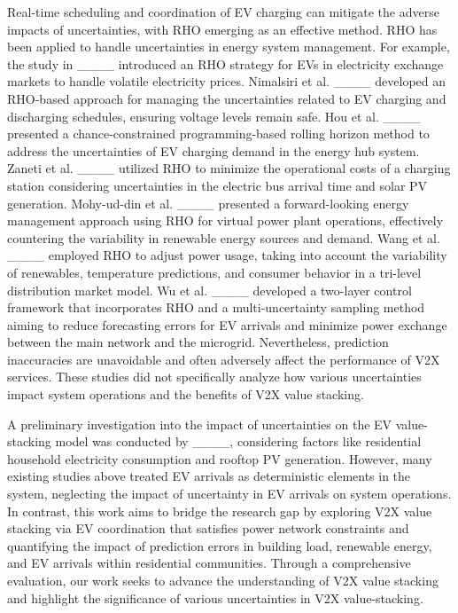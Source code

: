 Real-time scheduling and coordination of EV charging can mitigate the adverse impacts of uncertainties, with RHO emerging as an effective method. RHO has been applied to handle uncertainties in energy system management. For example, the study in ____ introduced an RHO strategy for EVs in electricity exchange markets to handle volatile electricity prices. Nimalsiri et al. ____ developed an RHO-based approach for managing the uncertainties related to EV charging and discharging schedules, ensuring voltage levels remain safe. Hou et al. ____ presented a chance-constrained programming-based rolling horizon method to address the uncertainties of EV charging demand in the energy hub system. Zaneti et al. ____ utilized RHO to minimize the operational costs of a charging station considering uncertainties in the electric bus arrival time and solar PV generation. Mohy-ud-din et al. ____ presented a forward-looking energy management approach using RHO for virtual power plant operations, effectively countering the variability in renewable energy sources and demand. Wang et al. ____ employed RHO to adjust power usage, taking into account the variability of renewables, temperature predictions, and consumer behavior in a tri-level distribution market model. Wu et al. ____ developed a two-layer control framework that incorporates RHO and a multi-uncertainty sampling method aiming to reduce forecasting errors for EV arrivals and minimize power exchange between the main network and the microgrid. Nevertheless, prediction inaccuracies are unavoidable and often adversely affect the performance of V2X services. These studies did not specifically analyze how various uncertainties impact system operations and the benefits of V2X value stacking. 

A preliminary investigation into the impact of uncertainties on the EV value-stacking model was conducted by ____, considering factors like residential household electricity consumption and rooftop PV generation. However, many existing studies above treated EV arrivals as deterministic elements in the system, neglecting the impact of uncertainty in EV arrivals on system operations. In contrast, this work aims to bridge the research gap by exploring V2X value stacking via EV coordination that satisfies power network constraints and quantifying the impact of prediction errors in building load, renewable energy, and EV arrivals within residential communities. Through a comprehensive evaluation, our work seeks to advance the understanding of V2X value stacking and highlight the significance of various uncertainties in V2X value-stacking.